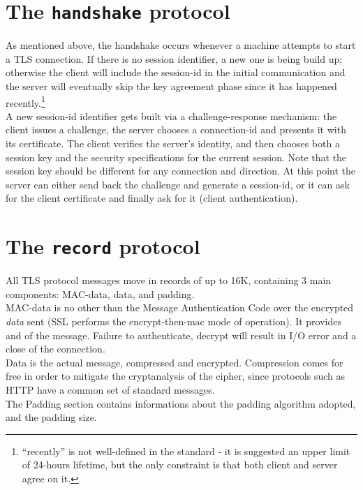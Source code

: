 \section{The \texttt{handshake} protocol}
As mentioned above, the handshake occurs whenever a machine attempts to start
a TLS connection. If there is no session identifier, a new one is being build
up; otherwise the client will include the session-id in the initial
communication and the server will eventually skip the key agreement phase since
it has happened recently.\footnote{``recently'' is not well-defined in
  the standard - it is suggested an upper limit of 24-hours lifetime, but the
  only constraint is that both client and server agree on it.}\\
A new session-id identifier gets built via a challenge-response mechanism: the
client issues a challenge, the server chooses a connection-id and presents it
with its certificate. The client verifies the server's identity, and then
chooses both a session key and the security specifications for the current
session. Note that the session key should be different for any connection and
direction. At this point the server can either send back the challenge and
generate a session-id, or it can ask for the client
certificate and finally ask for it (client authentication).

\vfill
\section{The \texttt{record} protocol}
All TLS protocol messages move in records of up to 16K, containing 3
main components: MAC-data, data, and padding.
\\
{MAC-data} is no other than the Message Authentication Code over the
encrypted \emph{data} sent
(SSL performs the encrypt-then-mac mode of operation).
It provides  and  of the message.
Failure to authenticate, decrypt will result in I/O error and a close of the
connection.
\\
{Data} is the actual message, compressed and encrypted. Compression comes
for free in order to mitigate the cryptanalysis of the cipher, since protocols
such as HTTP have a common set of standard messages.
\\
The {Padding} section contains informations about the padding algorithm
adopted, and the padding size.

